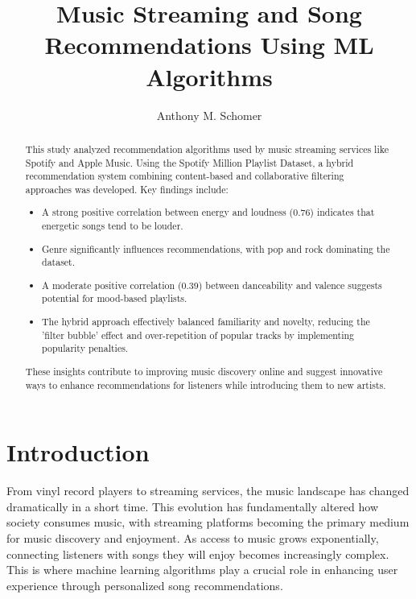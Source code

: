 \documentclass[runningheads]{llncs}
\begin{document}
\title{Music Streaming and Song Recommendations Using ML Algorithms}

\author{Anthony M. Schomer}



\maketitle

\begin{abstract}
This study analyzed recommendation algorithms used by music streaming services like Spotify and Apple Music. Using the Spotify Million Playlist Dataset, a hybrid recommendation system combining content-based and collaborative filtering approaches was developed. Key findings include:
\begin{itemize}
  \item A strong positive correlation between energy and loudness (0.76) indicates that energetic songs tend to be louder.
  \item Genre significantly influences recommendations, with pop and rock dominating the dataset.
  \item A moderate positive correlation (0.39) between danceability and valence suggests potential for mood-based playlists.
  \item The hybrid approach effectively balanced familiarity and novelty, reducing the 'filter bubble' effect and over-repetition of popular tracks by implementing popularity penalties.
\end{itemize}
These insights contribute to improving music discovery online and suggest innovative ways to enhance recommendations for listeners while introducing them to new artists.
\end{abstract}

\section{Introduction}

From vinyl record players to streaming services, the music landscape has changed dramatically in a short time. This evolution has fundamentally altered how society consumes music, with streaming platforms becoming the primary medium for music discovery and enjoyment. As access to music grows exponentially, connecting listeners with songs they will enjoy becomes increasingly complex. This is where machine learning algorithms play a crucial role in enhancing user experience through personalized song recommendations.
\end{document}
